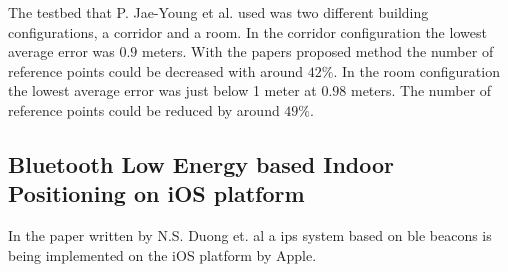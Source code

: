 \bigskip

The testbed that P. Jae-Young et al. used was two different building configurations, a corridor and a room.
In the corridor configuration the lowest average error was $0.9$ meters. 
With the papers proposed method the number of reference points could be decreased with around $42\%$.
In the room configuration the lowest average error was just below 1 meter at $0.98$ meters.
The number of reference points could be reduced by around $49\%$.

\subsection{Bluetooth Low Energy based Indoor Positioning on iOS platform}\label{sec:}
In the paper \cite{BluetoothLowEnergy2018} written by N.S. Duong et. al a \acrshort{ips} system based on \acrshort{ble} beacons is being implemented on the iOS platform by Apple.
